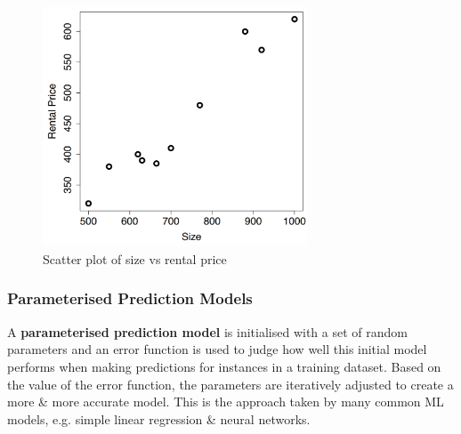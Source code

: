 \documentclass[a4paper,11pt]{article}
\begin{document}
\begin{figure}[H]
    \centering
    \includegraphics[width=0.7\textwidth]{images/sizevrentalprice.png}
    \caption{Scatter plot of size vs rental price}
    \label{fig:regression_scatter_plot}
\end{figure}

\subsubsection{Parameterised Prediction Models}
A \textbf{parameterised prediction model} is initialised with a set of random parameters and an error function is used to judge how well this initial model performs when making predictions for instances in a training dataset.
Based on the value of the error function, the parameters are iteratively adjusted to create a more \& more accurate model.
This is the approach taken by many common ML models, e.g. simple linear regression \& neural networks.
\end{document}

